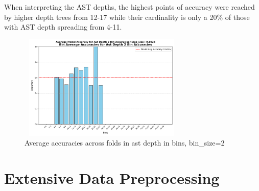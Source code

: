 \documentclass[10pt,english,a4paper]{report}
\begin{document}
When interpreting the AST depths, the highest points of accuracy were reached by higher depth trees from 12-17
while their cardinality is only a 20\% of those with AST depth spreading from 4-11.

\begin{figure}[H]
    \centering
    \includegraphics[width=8cm, height=5cm]{figures/testing/bins/ast_depth_2_bin_accuracies.pdf}
    \caption{Average accuracies across folds in ast depth in bins, bin\_size=2}
    \label{fig:bins_depth}
\end{figure}


\section{Extensive Data Preprocessing}






\end{document}
